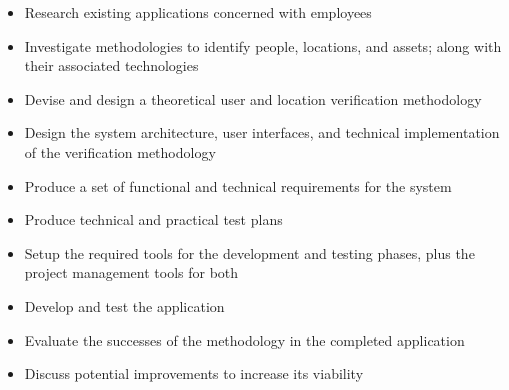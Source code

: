 \begin{itemize}
  \item Research existing applications concerned with
         employees
  \item Investigate methodologies to identify people,
        locations, and assets; along with their associated
        technologies
  \item Devise and design a theoretical user and location verification methodology
  \item Design the system architecture, user interfaces, and technical implementation of the 
        verification methodology
  \item Produce a set of functional and technical
  requirements for the system
    \item Produce technical and practical test plans
  \item Setup the required tools for the development and
  testing phases, plus the project management tools for both
  \item Develop and test the application
  \item Evaluate the successes of the methodology in the completed application
  \item Discuss potential improvements to increase its viability
\end{itemize}